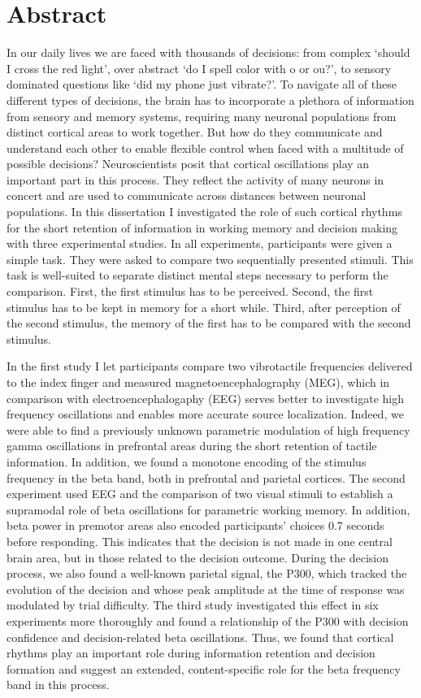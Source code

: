 
\chapter*{Abstract}
In our daily lives we are faced with thousands of decisions: from complex ‘should I cross the red light’, over abstract ‘do I spell color with o or ou?’, to sensory dominated questions like ‘did my phone just vibrate?’. To navigate all of these different types of decisions, the brain has to incorporate a plethora of information from sensory and memory systems, requiring many neuronal populations from distinct cortical areas to work together. But how do they communicate and understand each other to enable flexible control when faced with a multitude of possible decisions? Neuroscientists posit that cortical oscillations play an important part in this process. They reflect the activity of many neurons in concert and are used to communicate across distances between neuronal populations. In this dissertation I investigated the role of such cortical rhythms for the short retention of information in working memory and decision making with three experimental studies. In all experiments, participants were given a simple task. They were asked to compare two sequentially presented stimuli. This task is well-suited to separate distinct mental steps necessary to perform the comparison. First, the first stimulus has to be perceived. Second, the first stimulus has to be kept in memory for a short while. Third, after perception of the second stimulus, the memory of the first has to be compared with the second stimulus. 

In the first study I let participants compare two vibrotactile frequencies delivered to the index finger and measured magnetoencephalography (MEG), which in comparison with electroencephalogaphy (EEG) serves better to investigate high frequency oscillations and enables more accurate source localization. Indeed, we were able to find a previously unknown parametric modulation of high frequency gamma oscillations in prefrontal areas during the short retention of tactile information. In addition, we found a monotone encoding of the stimulus frequency in the beta band, both in prefrontal and parietal cortices. The second experiment used EEG and the comparison of two visual stimuli to establish a supramodal role of beta oscillations for parametric working memory. In addition, beta power in premotor areas also encoded participants’ choices 0.7 seconds before responding. This indicates that the decision is not made in one central brain area, but in those related to the decision outcome. During the decision process, we also found a well-known parietal signal, the P300, which tracked the evolution of the decision and whose peak amplitude at the time of response was modulated by trial difficulty. The third study investigated this effect in six experiments more thoroughly and found a relationship of the P300 with decision confidence and decision-related beta oscillations. Thus, we found that cortical rhythms play an important role during information retention and decision formation and suggest an extended, content-specific role for the beta frequency band in this process.

